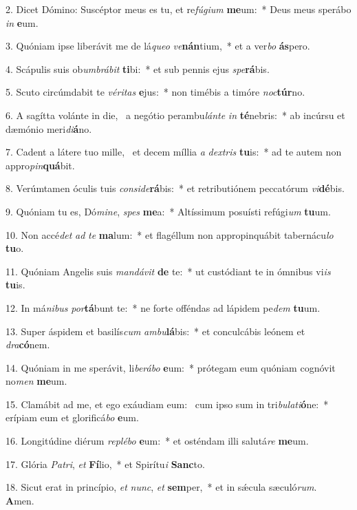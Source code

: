 2. Dicet Dómino: Suscéptor meus es tu, et re\textit{fú}\textit{gi}\textit{um} \textbf{me}um:~*  Deus meus sperábo \textit{in} \textbf{e}um.\

3. Quóniam ipse liberávit me de lá\textit{que}\textit{o} \textit{ve}\textbf{nán}tium,~*  et a ver\textit{bo} \textbf{ás}pero.\

4. Scápulis suis ob\textit{um}\textit{brá}\textit{bit} \textbf{ti}bi:~*  et sub pennis ejus \textit{spe}\textbf{rá}bis.\

5. Scuto circúmdabit te \textit{vé}\textit{ri}\textit{tas} \textbf{e}jus:~*  non timébis a timóre \textit{noc}\textbf{túr}no.\

6. A sagítta volánte in die, \dag\  a negótio perambu\textit{lán}\textit{te} \textit{in} \textbf{té}nebris:~*  ab incúrsu et dæmónio meri\textit{di}\textbf{á}no.\

7. Cadent a látere tuo mille, \dag\  et decem míllia \textit{a} \textit{dex}\textit{tris} \textbf{tu}is:~*  ad te autem non appro\textit{pin}\textbf{quá}bit.\

8. Verúmtamen óculis tuis \textit{con}\textit{si}\textit{de}\textbf{rá}bis:~*  et retributiónem peccatórum \textit{vi}\textbf{dé}bis.\

9. Quóniam tu es, Dó\textit{mi}\textit{ne}, \textit{spes} \textbf{me}a:~*  Altíssimum posuísti refúgi\textit{um} \textbf{tu}um.\

10. Non accé\textit{det} \textit{ad} \textit{te} \textbf{ma}lum:~*  et flagéllum non appropinquábit tabernácu\textit{lo} \textbf{tu}o.\

11. Quóniam Angelis suis \textit{man}\textit{dá}\textit{vit} \textbf{de} te:~*  ut custódiant te in ómnibus vi\textit{is} \textbf{tu}is.\

12. In má\textit{ni}\textit{bus} \textit{por}\textbf{tá}bunt te:~*  ne forte offéndas ad lápidem pe\textit{dem} \textbf{tu}um.\

13. Super áspidem et basilís\textit{cum} \textit{am}\textit{bu}\textbf{lá}bis:~*  et conculcábis leónem et \textit{dra}\textbf{có}nem.\

14. Quóniam in me sperávit, li\textit{be}\textit{rá}\textit{bo} \textbf{e}um:~*  prótegam eum quóniam cognóvit no\textit{men} \textbf{me}um.\

15. Clamábit ad me, et ego exáudiam eum: \dag\  cum ipso sum in tri\textit{bu}\textit{la}\textit{ti}\textbf{ó}ne:~*  erípiam eum et glorificá\textit{bo} \textbf{e}um.\

16. Longitúdine diérum \textit{re}\textit{plé}\textit{bo} \textbf{e}um:~*  et osténdam illi salutá\textit{re} \textbf{me}um.\

17. Glória \textit{Pa}\textit{tri}, \textit{et} \textbf{Fí}lio,~*  et Spirítu\textit{i} \textbf{Sanc}to.\

18. Sicut erat in princípio, \textit{et} \textit{nunc}, \textit{et} \textbf{sem}per,~*  et in sǽcula sæculó\textit{rum}. \textbf{A}men.\

